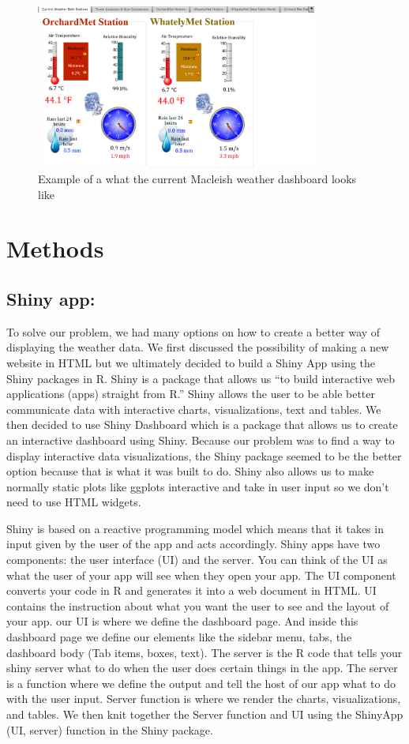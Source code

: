 \documentclass[10pt,letterpaper]{article}
\begin{document}
\begin{figure}
\includegraphics[width=350px]{current} \caption{Example of a what the current Macleish weather dashboard looks like}\label{fig:unnamed-chunk-1}
\end{figure}

\section{Methods}\label{methods}

\subsection{Shiny app:}\label{shiny-app}

To solve our problem, we had many options on how to create a better way
of displaying the weather data. We first discussed the possibility of
making a new website in HTML but we ultimately decided to build a Shiny
App using the Shiny packages in R. Shiny is a package that allows us
``to build interactive web applications (apps) straight from R.'' Shiny
allows the user to be able better communicate data with interactive
charts, visualizations, text and tables. We then decided to use Shiny
Dashboard which is a package that allows us to create an interactive
dashboard using Shiny. Because our problem was to find a way to display
interactive data visualizations, the Shiny package seemed to be the
better option because that is what it was built to do. Shiny also allows
us to make normally static plots like ggplots interactive and take in
user input so we don't need to use HTML widgets.

Shiny is based on a reactive programming model which means that it takes
in input given by the user of the app and acts accordingly. Shiny apps
have two components: the user interface (UI) and the server. You can
think of the UI as what the user of your app will see when they open
your app. The UI component converts your code in R and generates it into
a web document in HTML. UI contains the instruction about what you want
the user to see and the layout of your app. our UI is where we define
the dashboard page. And inside this dashboard page we define our
elements like the sidebar menu, tabs, the dashboard body (Tab items,
boxes, text). The server is the R code that tells your shiny server what
to do when the user does certain things in the app. The server is a
function where we define the output and tell the host of our app what to
do with the user input. Server function is where we render the charts,
visualizations, and tables. We then knit together the Server function
and UI using the ShinyApp (UI, server) function in the Shiny package.
\end{document}

